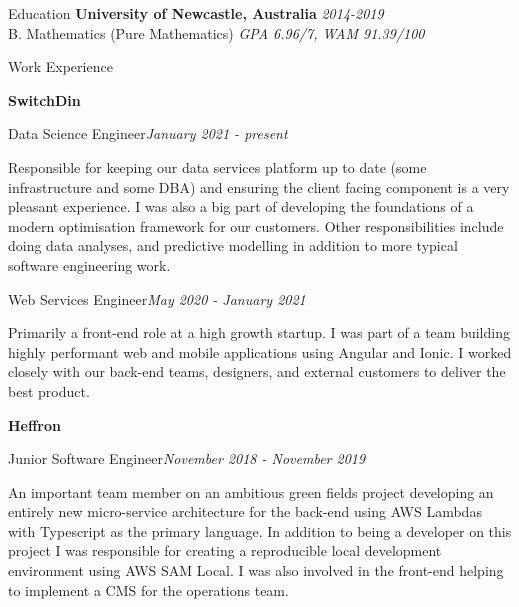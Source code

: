 \documentclass{resume} %
\begin{document}

\begin{rSection}{Education}
    {\bf University of Newcastle, Australia} \hfill {\em 2014-2019}
    \\ B. Mathematics (Pure Mathematics) \hfill {\em GPA 6.96/7, WAM 91.39/100}
\end{rSection}


\begin{rSection}{Work Experience}

{\bf SwitchDin}

\begin{adjustwidth}{2em}{}
    \begin{rSubsection}{Data Science Engineer}{\em January 2021 - present}{}{}
    \item  Responsible for keeping our data services platform up to date (some infrastructure and some DBA) and ensuring the client facing component is a very pleasant experience. I was also a big part of developing the foundations of a modern optimisation framework for our customers. Other responsibilities include doing data analyses, and predictive modelling in addition to more typical software engineering work.
    \end{rSubsection}

    \begin{rSubsection}{Web Services Engineer}{\em May 2020 - January 2021}{}{}
    \item Primarily a front-end role at a high growth startup. I was part of a team building highly performant web and mobile applications using Angular and Ionic. I worked closely with our back-end teams, designers, and external customers to deliver the best product.
    \end{rSubsection}
\end{adjustwidth}

{\bf Heffron}

\begin{adjustwidth}{2em}{}
    \begin{rSubsection}{Junior Software Engineer}{\em November 2018 - November 2019}{}{}
    \item An important team member on an ambitious green fields project developing an entirely new micro-service architecture for the back-end using AWS Lambdas with Typescript as the primary language. In addition to being a developer on this project I was responsible for creating a reproducible local development environment using AWS SAM Local. I was also involved in the front-end helping to implement a CMS for the operations team.
    \end{rSubsection}


\end{adjustwidth}
\end{rSection}
\end{document}
